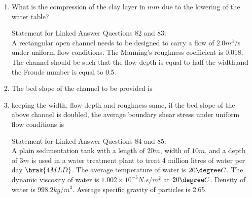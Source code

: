 \begin{enumerate}[start=74]
\begin{enumerate}
\end{enumerate}
\item %
What is the compression of the clay layer in $mm$ due to the lowering of the water table?
\begin{enumerate}
\end{enumerate}
Statement for Linked Answer Questions 82 and 83:\\
A rectangular open channel needs to be designed to carry a flow of $2.0 m^3$/s under uniform flow conditions. The Manning's roughness coefficient is 0.018. The channel should be such that the flow depth is equal to half the width,and the Froude number is equal to 0.5.
\item %
The bed slope of the channel to be provided is
\begin{enumerate}
\end{enumerate}
\item %
keeping the width, flow depth and roughness same, if the bed slope of the above channel is doubled, the average boundary shear stress under uniform flow conditions is 
\begin{enumerate}
\end{enumerate}
Statement for Linked Answer Questions 84 and 85:\\
A plain sedimentation tank with a length of $20 m$, width of $10 m$, and a depth of $3 m$ is used in a water treatment plant to treat 4 million litres of water per day $\brak{4 MLD}$. The average temperature of water is $20 \degree C$. The dynamic viscosity of water is $1.002 \times 10^{-3} N.s /m^2$ at $20 \degree C$. Density of water is $998.2 kg/m^3$. Average specific gravity of particles is 2.65.

\end{enumerate}
